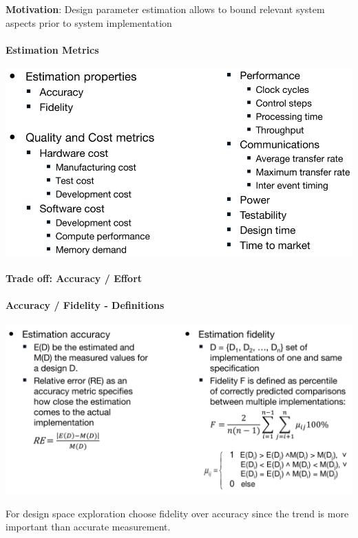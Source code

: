 \documentclass[english]{latex4ei/latex4ei_sheet}
\begin{document}
\textbf{Motivation}: Design parameter estimation allows to bound
relevant system aspects prior to system implementation

\paragraph{Estimation Metrics}

\begin{center}
  \includegraphics[width=0.8\linewidth]{assets/EstimationMetrics.png}
  \label{fig:estimationmetrics}
\end{center}

\paragraph{Trade off: Accuracy / Effort}


\paragraph{Accuracy / Fidelity - Definitions}
\begin{center}
  \includegraphics[width=\linewidth]{assets/AccuracyFidelityDefinitions.png}
  \label{fig:accuracyfidelitydefinitions}
\end{center}

For design space exploration choose fidelity over accuracy since the trend is more important than accurate measurement.
\end{document}
